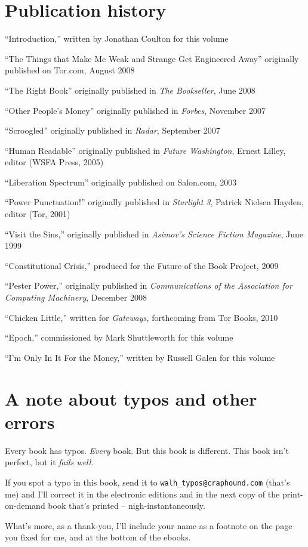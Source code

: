 \section{Publication history}
\begin{flushleft}
\setlength{\parskip}{0.5\baselineskip}
“Introduction,” written by Jonathan Coulton for this volume

“The Things that Make Me Weak and Strange Get Engineered Away” 
originally published on Tor.com, August 2008

“The Right Book” originally published in \emph{The Bookseller}, 
June 2008

“Other People's Money” originally published in \emph{Forbes}, 
November 2007

“Scroogled” originally published in \emph{Radar}, September 2007

“Human Readable” originally published in \emph{Future Washington}, 
Ernest Lilley, editor (WSFA Press, 2005)

“Liberation Spectrum” originally published on Salon.com, 2003

“Power Punctuation!” originally published in \emph{Starlight 3}, 
Patrick Nielsen Hayden, editor (Tor, 2001)

“Visit the Sins,” originally published in \emph{Asimov's Science 
Fiction Magazine}, June 1999

“Constitutional Crisis,” produced for the Future of the Book 
Project, 2009

“Pester Power,” originally published in \emph{Communications of the 
Association for Computing Machinery}, December 2008

“Chicken Little,” written for \emph{Gateways,} forthcoming from Tor 
Books, 2010

“Epoch,” commissioned by Mark Shuttleworth for this volume

“I'm Only In It For the Money,” written by Russell Galen for this 
volume
\end{flushleft}

\section{A note about typos and other errors}
\begin{flushleft}
Every book has typos. \emph{Every} book. But this book is different. 
This book isn't perfect, but it \emph{fails well.}

If you spot a typo in this book, send it to
\texttt{walh\_typos@craphound.com} 
(that's me) and I'll correct it in the electronic editions and in the 
next copy of the print-on-demand book that's printed -- 
nigh-instantaneously.

What's more, as a thank-you, I'll include your name as a footnote on 
the page you fixed for me, and at the bottom of the ebooks.
\end{flushleft}

